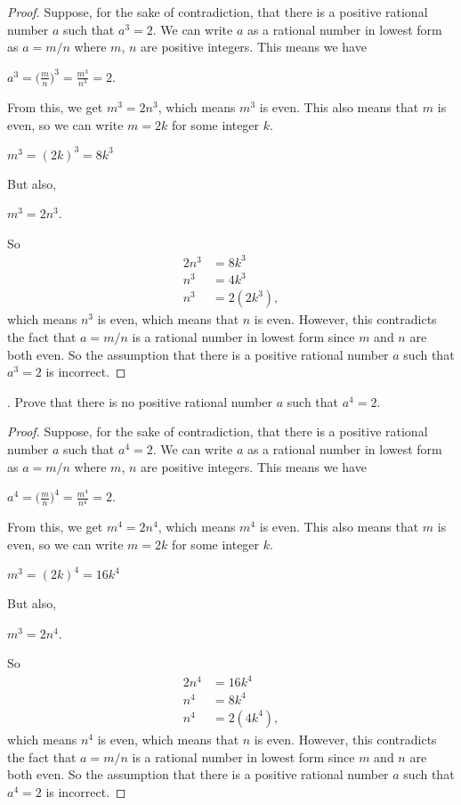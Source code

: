 \documentclass[12pt]{article}
\begin{document}
\begin{proof}
Suppose, for the sake of contradiction, that there is a positive rational number $a$ such that $a^3=2$. We can write $a$ as a rational number in lowest form as $a=m/n$ where $m$, $n$ are positive integers. This means we have
\begin{center}
$a^3=\displaystyle \bigg(\frac{m}{n}\bigg)^3=\displaystyle \frac{m^3}{n^3}=2$.
\end{center}
From this, we get $m^3=2n^3$, which means $m^3$ is even. This also means that $m$ is even, so we can write $m=2k$ for some integer $k$.
\begin{center}
$m^3=(2k)^3=8k^3$
\end{center}
But also,
\begin{center}
$m^3=2n^3$.
\end{center}
So
\begin{align*}
2n^3&=8k^3 \\
n^3&=4k^3 \\
n^3&=2(2k^3),
\end{align*}
which means $n^3$ is even, which means that $n$ is even. However, this contradicts the fact that $a=m/n$ is a rational number in lowest form since $m$ and $n$ are both even. So the assumption that there is a positive rational number $a$ such that $a^3=2$ is incorrect.
\end{proof}
. Prove that there is no positive rational number $a$ such that $a^4=2$.
\begin{proof}
Suppose, for the sake of contradiction, that there is a positive rational number $a$ such that $a^4=2$. We can write $a$ as a rational number in lowest form as $a=m/n$ where $m$, $n$ are positive integers. This means we have
\begin{center}
$a^4=\displaystyle \bigg(\frac{m}{n}\bigg)^4=\displaystyle \frac{m^4}{n^4}=2$.
\end{center}
From this, we get $m^4=2n^4$, which means $m^4$ is even. This also means that $m$ is even, so we can write $m=2k$ for some integer $k$.
\begin{center}
$m^3=(2k)^4=16k^4$
\end{center}
But also,
\begin{center}
$m^3=2n^4$.
\end{center}
So
\begin{align*}
2n^4&=16k^4 \\
n^4&=8k^4 \\
n^4&=2(4k^4),
\end{align*}
which means $n^4$ is even, which means that $n$ is even. However, this contradicts the fact that $a=m/n$ is a rational number in lowest form since $m$ and $n$ are both even. So the assumption that there is a positive rational number $a$ such that $a^4=2$ is incorrect.
\end{proof}
\end{document}
